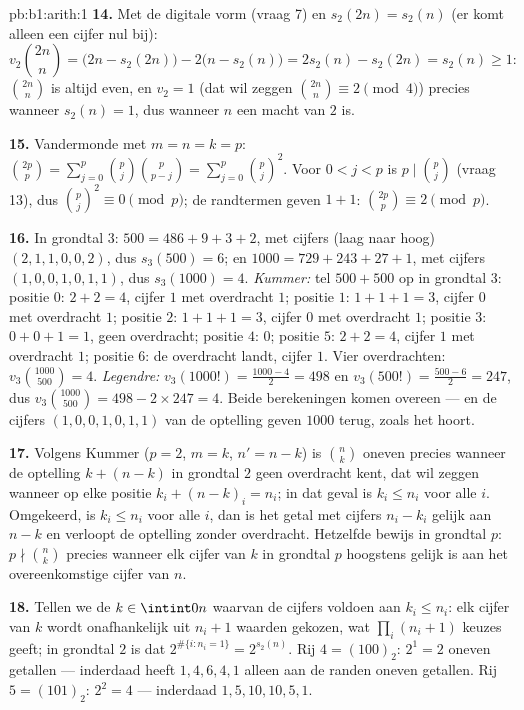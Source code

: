 \begin{solution}{pb:b1:arith:1}
\textbf{14.} Met de digitale vorm (vraag 7) en $s_2(2n) = s_2(n)$ (er
komt alleen een cijfer nul bij):
\[
v_2\binom{2n}n = \bigl(2n - s_2(2n)\bigr) - 2\bigl(n -
s_2(n)\bigr) = 2s_2(n) - s_2(2n) = s_2(n) \geq 1 :
\]
$\binom{2n}n$ is altijd even, en $v_2 = 1$ (dat wil zeggen $\binom{2n}n
\equiv 2 \pmod 4$) precies wanneer $s_2(n) = 1$, dus wanneer $n$ een
macht van $2$ is.

\textbf{15.} Vandermonde met $m = n = k = p$: $\binom{2p}p =
\sum_{j=0}^p \binom pj\binom p{p-j} = \sum_{j=0}^p \binom pj^2$. Voor $0
< j < p$ is $p \mid \binom pj$ (vraag 13), dus $\binom pj^2 \equiv 0
\pmod p$; de randtermen geven $1 + 1$: $\binom{2p}p \equiv 2 \pmod p$.

\textbf{16.} In grondtal $3$: $500 = 486 + 9 + 3 + 2$, met cijfers (laag
naar hoog) $(2, 1, 1, 0, 0, 2)$, dus $s_3(500) = 6$; en $1000 = 729 + 243
+ 27 + 1$, met cijfers $(1, 0, 0, 1, 0, 1, 1)$, dus $s_3(1000) = 4$.
\emph{Kummer:} tel $500 + 500$ op in grondtal $3$: positie $0$: $2 + 2 =
4$, cijfer $1$ met overdracht $1$; positie $1$: $1 + 1 + 1 = 3$, cijfer
$0$ met overdracht $1$; positie $2$: $1 + 1 + 1 = 3$, cijfer $0$ met
overdracht $1$; positie $3$: $0 + 0 + 1 = 1$, geen overdracht; positie
$4$: $0$; positie $5$: $2 + 2 = 4$, cijfer $1$ met overdracht $1$;
positie $6$: de overdracht landt, cijfer $1$. Vier overdrachten:
$v_3\binom{1000}{500} = 4$. \emph{Legendre:} $v_3(1000!) = \frac{1000 -
4}2 = 498$ en $v_3(500!) = \frac{500 - 6}2 = 247$, dus
$v_3\binom{1000}{500} = 498 - 2\times247 = 4$. Beide berekeningen komen
overeen --- en de cijfers $(1, 0, 0, 1, 0, 1, 1)$ van de optelling geven
$1000$ terug, zoals het hoort.

\textbf{17.} Volgens Kummer ($p = 2$, $m = k$, $n' = n - k$) is $\binom
nk$ oneven precies wanneer de optelling $k + (n - k)$ in grondtal $2$
geen overdracht kent, dat wil zeggen wanneer op elke positie $k_i + (n -
k)_i = n_i$; in dat geval is $k_i \leq n_i$ voor alle $i$. Omgekeerd, is
$k_i \leq n_i$ voor alle $i$, dan is het getal met cijfers $n_i - k_i$
gelijk aan $n - k$ en verloopt de optelling zonder overdracht. Hetzelfde
bewijs in grondtal $p$: $p \nmid \binom nk$ precies wanneer elk cijfer
van $k$ in grondtal $p$ hoogstens gelijk is aan het overeenkomstige
cijfer van $n$.

\textbf{18.} Tellen we de $k \in \intint0n$ waarvan de cijfers voldoen aan
$k_i \leq n_i$: elk cijfer van $k$ wordt onafhankelijk uit $n_i + 1$
waarden gekozen, wat $\prod_i (n_i + 1)$ keuzes geeft; in grondtal $2$ is
dat $2^{\#\{i : n_i = 1\}} = 2^{s_2(n)}$. Rij $4 = (100)_2$: $2^1 = 2$
oneven getallen --- inderdaad heeft $1, 4, 6, 4, 1$ alleen aan de randen
oneven getallen. Rij $5 = (101)_2$: $2^2 = 4$ --- inderdaad $1, 5, 10,
10, 5, 1$.


\end{solution}
